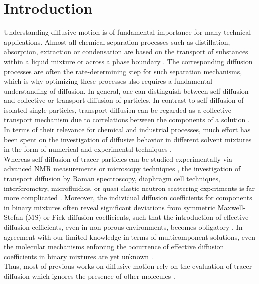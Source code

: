 \documentclass[aip,jcp,reprint]{revtex4-1}
\begin{document}
\section{Introduction}
Understanding diffusive motion is of fundamental importance for many technical applications.
Almost all chemical separation processes such as distillation, absorption, extraction or condensation are based on the transport of substances within a liquid mixture or across a phase boundary \cite{seader06a,wankat22a}.
The corresponding diffusion processes are often the rate-determining step for such separation mechanisms, which is why optimizing these processes also requires a fundamental understanding of diffusion.
In general, one can distinguish between self-diffusion  and collective  or transport diffusion of  particles.
In contrast to self-diffusion of isolated single particles,  transport diffusion can be regarded as a collective transport mechanism due to correlations between the components of a solution \cite{taylor93a,bird04a,newman12a,groot13a,liu13a,guevara16a,janzen17a}.
In terms of their relevance for chemical and industrial processes, much effort has been spent on the investigation of diffusive behavior in different solvent mixtures \cite{maxwell67a,bird04a,newman12a, groot13a} in the form of numerical and experimental techniques \cite{kincaid83a,derlacki85a,vink85a,trullas93a,vergara01a, keffer05a,rehfeldt07a,krishna08a,krishna09a,rehfeldt10a,liu11a,moggridge12a,liu13a,parez13a,zhu15a,bardow15a,guevara16a,janzen17a}.\\
Whereas self-diffusion of tracer particles can be studied experimentally via advanced NMR measurements or microscopy techniques \cite{kashyap11a},  the investigation of transport diffusion by  Raman
spectroscopy, diaphragm cell techniques, interferometry,
microfluidics, or quasi-elastic neutron scattering experiments is far more complicated \cite{liu13a,taylor93a}.
Moreover, the individual diffusion coefficients for components in binary mixtures  often reveal significant deviations from symmetric Maxwell-Stefan (MS) or Fick diffusion coefficients, such that the introduction of effective diffusion cefficients, even in non-porous environments, becomes obligatory \cite{taylor93a}.  
In agreement with our limited knowledge in terms of multicomponent solutions, even the molecular mechanisms enforcing the occurrence of effective diffusion coefficients in binary mixtures are yet unknown \cite{taylor93a}. \\
Thus, most of previous works on diffusive motion rely on the evaluation of tracer diffusion which ignores the presence of other molecules  \cite{liu13a}.  
\end{document}
